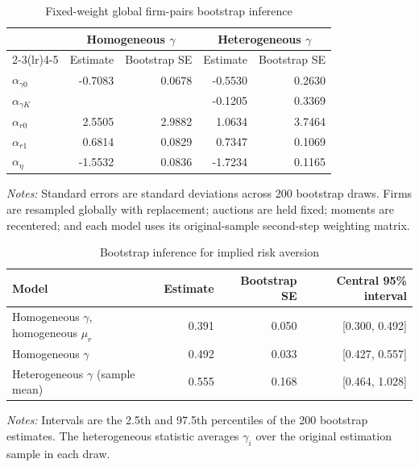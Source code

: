 \documentclass[10pt]{article}
\begin{document}
\begin{table}[H]
\centering
\caption{Fixed-weight global firm-pairs bootstrap inference}
\label{tab:gmm_bootstrap_parameters}
\begin{tabular}{lrrrr}
\toprule
& \multicolumn{2}{c}{Homogeneous $\gamma$}
& \multicolumn{2}{c}{Heterogeneous $\gamma$}\\
\cmidrule(lr){2-3}\cmidrule(lr){4-5}
& Estimate & Bootstrap SE & Estimate & Bootstrap SE\\
\midrule
$\alpha_{\gamma0}$ & -0.7083 & 0.0678 & -0.5530 & 0.2630\\
$\alpha_{\gamma K}$ & & & -0.1205 & 0.3369\\
$\alpha_{r0}$ & 2.5505 & 2.9882 & 1.0634 & 3.7464\\
$\alpha_{r1}$ & 0.6814 & 0.0829 & 0.7347 & 0.1069\\
$\alpha_\eta$ & -1.5532 & 0.0836 & -1.7234 & 0.1165\\
\bottomrule
\end{tabular}
\begin{minipage}{0.92\textwidth}
\footnotesize
\textit{Notes:} Standard errors are standard deviations across 200 bootstrap
draws. Firms are resampled globally with replacement; auctions are held fixed;
moments are recentered; and each model uses its original-sample second-step
weighting matrix.
\end{minipage}
\end{table}

\begin{table}[H]
\centering
\caption{Bootstrap inference for implied risk aversion}
\label{tab:gmm_bootstrap_gamma}
\begin{tabular}{lrrr}
\toprule
Model & Estimate & Bootstrap SE & Central 95\% interval\\
\midrule
Homogeneous $\gamma$, homogeneous $\mu_r$
& 0.391 & 0.050 & [0.300, 0.492]\\
Homogeneous $\gamma$
& 0.492 & 0.033 & [0.427, 0.557]\\
Heterogeneous $\gamma$ (sample mean)
& 0.555 & 0.168 & [0.464, 1.028]\\
\bottomrule
\end{tabular}
\begin{minipage}{0.92\textwidth}
\footnotesize
\textit{Notes:} Intervals are the 2.5th and 97.5th percentiles of the 200
bootstrap estimates. The heterogeneous statistic averages $\gamma_i$ over the
original estimation sample in each draw.
\end{minipage}
\end{table}
\end{document}
